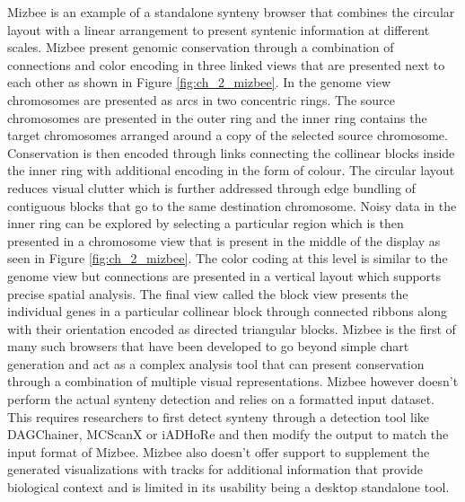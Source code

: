 Mizbee is an example of a standalone synteny browser that combines the circular layout with a linear arrangement to present syntenic information at different scales. Mizbee present genomic conservation through a combination of connections and color encoding in three linked views that are presented next to each other as shown in Figure \ref{fig:ch_2_mizbee}. In the genome view chromosomes are presented as arcs in two concentric rings. The source chromosomes are presented in the outer ring and the inner ring contains the target chromosomes arranged around a copy of the selected source chromosome. Conservation is then encoded through links connecting the collinear blocks 
inside the inner ring with additional encoding in the form of colour. The circular layout reduces visual clutter which is further addressed through edge bundling of contiguous blocks that go to the same destination chromosome. Noisy data in the inner ring can be explored by selecting a particular region which is then presented in a chromosome view that is present in the middle of the display as seen in Figure \ref{fig:ch_2_mizbee}. The color coding at this level is similar to the genome view but connections are presented in a vertical layout which supports precise spatial analysis. The final view called the block view presents the individual genes in a particular collinear block through connected ribbons along with their orientation encoded as directed triangular blocks. Mizbee is the first of many such browsers that have been developed to go beyond simple chart generation and act as a complex analysis tool that can present conservation through a combination of multiple visual representations. Mizbee however doesn't perform the actual synteny detection and relies on a formatted input dataset. This requires researchers to first detect synteny through a detection tool like DAGChainer, MCScanX or iADHoRe and then modify the output to match the input format of Mizbee. Mizbee also doesn't offer support to supplement the generated visualizations with tracks for additional information that provide biological context and is limited in its usability being a desktop standalone tool. 

